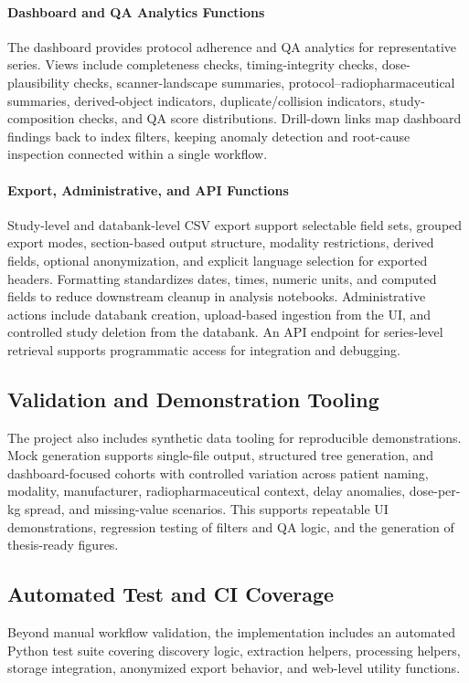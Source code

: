 \paragraph{Dashboard and QA Analytics Functions}
The dashboard provides protocol adherence and QA analytics for representative series. Views include completeness checks, timing-integrity checks, dose-plausibility checks, scanner-landscape summaries, protocol--radiopharmaceutical summaries, derived-object indicators, duplicate/collision indicators, study-composition checks, and QA score distributions. Drill-down links map dashboard findings back to index filters, keeping anomaly detection and root-cause inspection connected within a single workflow.

\paragraph{Export, Administrative, and API Functions}
Study-level and databank-level CSV export support selectable field sets, grouped export modes, section-based output structure, modality restrictions, derived fields, optional anonymization, and explicit language selection for exported headers. Formatting standardizes dates, times, numeric units, and computed fields to reduce downstream cleanup in analysis notebooks. Administrative actions include databank creation, upload-based ingestion from the UI, and controlled study deletion from the databank. An API endpoint for series-level retrieval supports programmatic access for integration and debugging.

\subsection{Validation and Demonstration Tooling}
The project also includes synthetic data tooling for reproducible demonstrations. Mock generation supports single-file output, structured tree generation, and dashboard-focused cohorts with controlled variation across patient naming, modality, manufacturer, radiopharmaceutical context, delay anomalies, dose-per-kg spread, and missing-value scenarios. This supports repeatable UI demonstrations, regression testing of filters and QA logic, and the generation of thesis-ready figures.

\subsection{Automated Test and CI Coverage}
Beyond manual workflow validation, the implementation includes an automated Python test suite covering discovery logic, extraction helpers, processing helpers, storage integration, anonymized export behavior, and web-level utility functions.

